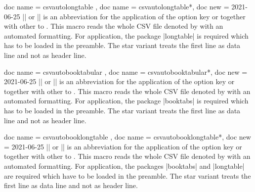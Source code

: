 \documentclass[a4paper,11pt]{ltxdoc}
\begin{document}
\clearpage

\begin{docCommands}[
    doc parameter = \oarg{options}\marg{file name}
  ]
  {
    { doc name = csvautolongtable  },
    { doc name = csvautolongtable*, doc new = 2021-06-25 }
  }
  |\csvautolongtable| or |\csvautolongtable*|
  is an abbreviation for the application of the option key
   or 
  together with other  to .
  This macro reads the whole CSV file denoted by 
  with an automated formatting.
  For application, the package |longtable| is required which has to be
  loaded in the preamble.
  The star variant treats the first line as data line and not as header line.
\begin{dispListing}
\end{dispListing}
\end{docCommands}



\begin{docCommands}[
    doc parameter = \oarg{options}\marg{file name}
  ]
  {
    { doc name = csvautobooktabular  },
    { doc name = csvautobooktabular*, doc new = 2021-06-25 }
  }
  |\csvautobooktabular| or |\csvautobooktabular*|
  is an abbreviation for the application of the option key
   or 
  together with other  to .
  This macro reads the whole CSV file denoted by 
  with an automated formatting.
  For application, the package |booktabs| is required which has to be
  loaded in the preamble.
  The star variant treats the first line as data line and not as header line.
\begin{dispExample}
\end{dispExample}
\end{docCommands}


\begin{docCommands}[
    doc parameter = \oarg{options}\marg{file name}
  ]
  {
    { doc name = csvautobooklongtable  },
    { doc name = csvautobooklongtable*, doc new = 2021-06-25 }
  }
  |\csvautobooklongtable| or |\csvautobooklongtable*|
  is an abbreviation for the application of the option key
   or 
  together with other  to .
  This macro reads the whole CSV file denoted by 
  with an automated formatting.
  For application, the packages |booktabs| and |longtable| are required which have to be
  loaded in the preamble.
  The star variant treats the first line as data line and not as header line.
\begin{dispListing}
\end{dispListing}
\end{docCommands}
\end{document}
